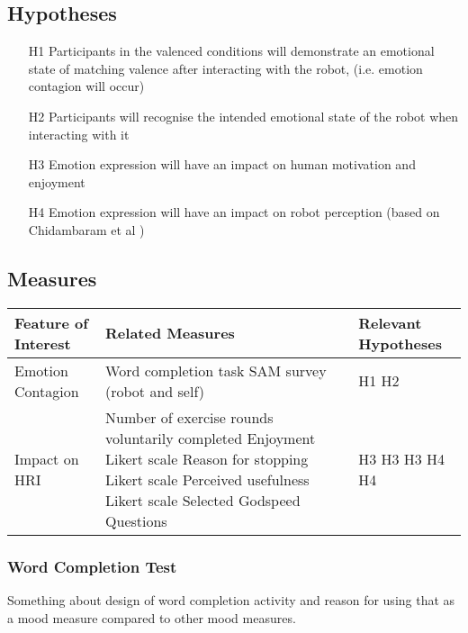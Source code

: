 \documentclass[11pt,a4paper]{report}
\begin{document}
\subsection{Hypotheses}
\begin{itemize}
	\item[H1] Participants in the valenced conditions will demonstrate an emotional state of matching valence after interacting with the robot, (i.e. emotion contagion will occur)
	\item[H2] Participants will recognise the intended emotional state of the robot when interacting with it
	\item[H3] Emotion expression will have an impact on human motivation and enjoyment 
	\item[H4] Emotion expression will have an impact on robot perception (based on Chidambaram et al \cite{chidambaram2012designing})

\end{itemize}

\subsection{Measures}
\begin{tabular}{|l|p{7cm}|p{3.8cm}|}
\hline Feature of Interest & Related Measures & Relevant Hypotheses \\ 
\hline Emotion Contagion & Word completion task \newline SAM survey (robot and self) & H1 \newline H2 \\ 
\hline Impact on HRI & Number of exercise rounds voluntarily completed \newline Enjoyment Likert scale \newline Reason for stopping Likert scale \newline Perceived usefulness Likert scale \newline Selected Godspeed Questions &  H3 \newline \newline H3 \newline H3 \newline H4 \newline H4 \\
\hline 
\end{tabular} 

\subsubsection{Word Completion Test}
Something about design of word completion activity and reason for using that as a mood measure compared to other mood measures. 
\end{document}
